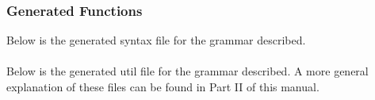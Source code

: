 \subsubsection{Generated Functions}
Below is the generated syntax file for the grammar described.\\
\ \\
%
Below is the generated util file for the grammar described. A more general explanation
of these files can be found in Part II of this manual. \\
